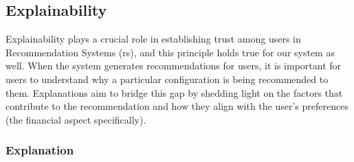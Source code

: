 \subsection{Explainability}

Explainability plays a crucial role in establishing trust among users in Recommendation Systems (\gls{rs}), and this principle holds true for our system as well. 
When the system generates recommendations for users, it is important for users to understand why a particular configuration is being recommended to them. 
Explanations aim to bridge this gap by shedding light on the factors that contribute to the recommendation and how they align with the user's preferences (the financial aspect specifically). 


\subsubsection{Explanation}

